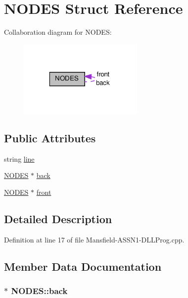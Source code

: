 \hypertarget{struct_n_o_d_e_s}{
\section{NODES Struct Reference}
\label{struct_n_o_d_e_s}
}


Collaboration diagram for NODES:
\nopagebreak
\begin{figure}[H]
\begin{center}
\leavevmode
\includegraphics[width=172pt]{struct_n_o_d_e_s__coll__graph}
\end{center}
\end{figure}
\subsection*{Public Attributes}
\begin{DoxyCompactItemize}
\item 
string \hyperlink{struct_n_o_d_e_s_ae8b9b97e43bab5b3608363d525259390}{line}
\item 
\hyperlink{struct_n_o_d_e_s}{NODES} $\ast$ \hyperlink{struct_n_o_d_e_s_aafa2d983a6a6d37de2cd3ca9183380bc}{back}
\item 
\hyperlink{struct_n_o_d_e_s}{NODES} $\ast$ \hyperlink{struct_n_o_d_e_s_a6620bfdf0352db36979260789d54f583}{front}
\end{DoxyCompactItemize}


\subsection{Detailed Description}


Definition at line 17 of file Mansfield-\/ASSN1-\/DLLProg.cpp.



\subsection{Member Data Documentation}
\hypertarget{struct_n_o_d_e_s_aafa2d983a6a6d37de2cd3ca9183380bc}{
\subsubsection[{back}]{$\ast$ {\bf NODES::back}}}
\label{struct_n_o_d_e_s_aafa2d983a6a6d37de2cd3ca9183380bc}


